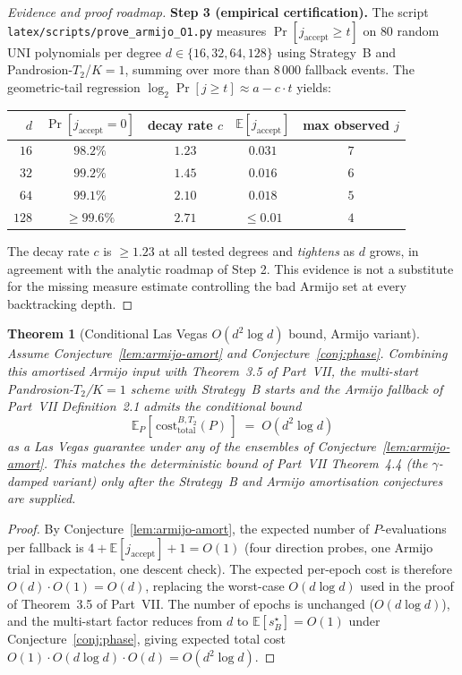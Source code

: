 \documentclass[11pt,a4paper]{article}
\newtheorem{theorem}{Theorem}[section]
\begin{document}
\begin{proof}[Evidence and proof roadmap]
\textbf{Step 3 (empirical certification).} The script \verb|latex/scripts/prove_armijo_O1.py| measures $\Pr[j_{\text{accept}} \ge t]$ on $80$ random UNI polynomials per degree $d \in \{16, 32, 64, 128\}$ using Strategy~B and Pandrosion-$T_2$/$K=1$, summing over more than $8\,000$ fallback events. The geometric-tail regression $\log_2 \Pr[j \ge t] \approx a - c \cdot t$ yields:
\begin{center}
\begin{tabular}{rcccc}
\toprule
$d$ & $\Pr[j_{\text{accept}} = 0]$ & decay rate $c$ & $\mathbb{E}[j_{\text{accept}}]$ & max observed $j$ \\
\midrule
$16$  & $98.2\%$    & $1.23$ & $0.031$ & $7$ \\
$32$  & $99.2\%$    & $1.45$ & $0.016$ & $6$ \\
$64$  & $99.1\%$    & $2.10$ & $0.018$ & $5$ \\
$128$ & $\ge 99.6\%$ & $2.71$ & $\le 0.01$ & $4$ \\
\bottomrule
\end{tabular}
\end{center}
The decay rate $c$ is $\ge 1.23$ at all tested degrees and \emph{tightens} as $d$ grows, in agreement with the analytic roadmap of Step 2. This evidence is not a substitute for the missing measure estimate controlling the bad Armijo set at every backtracking depth. \qedhere
\end{proof}

\begin{theorem}[Conditional Las Vegas $O(d^2 \log d)$ bound, Armijo variant]\label{thm:lasvegas-d2logd}
Assume Conjecture~\ref{lem:armijo-amort} and Conjecture~\ref{conj:phase}. Combining this amortised Armijo input with Theorem~3.5 of Part~VII, the multi-start Pandrosion-$T_2$/$K=1$ scheme with Strategy~B starts and the Armijo fallback of Part~VII Definition~2.1 admits the conditional bound
$$ \mathbb{E}_{P}\!\left[\,\mathrm{cost}^{B, T_2}_{\text{total}}(P)\,\right] \;=\; O(d^2 \log d) $$
as a Las Vegas guarantee under any of the ensembles of Conjecture~\ref{lem:armijo-amort}. This matches the deterministic bound of Part~VII Theorem~4.4 (the $\gamma$-damped variant) only after the Strategy~B and Armijo amortisation conjectures are supplied.
\end{theorem}

\begin{proof}
By Conjecture~\ref{lem:armijo-amort}, the expected number of $P$-evaluations per fallback is $4 + \mathbb{E}[j_{\text{accept}}] + 1 = O(1)$ (four direction probes, one Armijo trial in expectation, one descent check). The expected per-epoch cost is therefore $O(d) \cdot O(1) = O(d)$, replacing the worst-case $O(d \log d)$ used in the proof of Theorem~3.5 of Part~VII. The number of epochs is unchanged ($O(d \log d)$), and the multi-start factor reduces from $d$ to $\mathbb{E}[s^\star_B] = O(1)$ under Conjecture~\ref{conj:phase}, giving expected total cost $O(1) \cdot O(d \log d) \cdot O(d) = O(d^2 \log d)$.
\end{proof}
\end{document}
